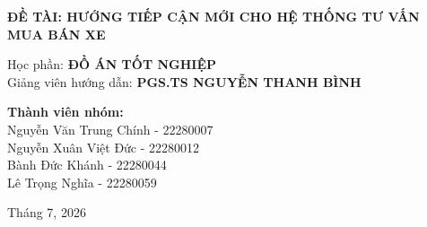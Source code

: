 \begin{titlepage}
	\vspace{1.5cm}
	\textbf{\large ĐỀ TÀI: HƯỚNG TIẾP CẬN MỚI CHO HỆ THỐNG TƯ VẤN MUA BÁN XE}
	\vspace{0.3cm}													
        \begin{center}
            \begin{minipage}{0.7\textwidth} %
                \raggedright %
                \normalsize
                Học phần: \textbf {ĐỒ ÁN TỐT NGHIỆP}\\
                Giảng viên hướng dẫn: \textbf{PGS.TS NGUYỄN THANH BÌNH}\\
            \end{minipage}
        \end{center}

														
	\vspace{1.5cm}
        \begin{center}
            \begin{minipage}{0.8\textwidth}
                \raggedright
                \normalsize
                \textbf{Thành viên nhóm:}
                \vspace{0.2cm}\\
                Nguyễn Văn Trung Chính - 22280007\\
                Nguyễn Xuân Việt Đức - 22280012\\
                Bành Đức Khánh - 22280044\\
                Lê Trọng Nghĩa - 22280059
            \end{minipage}
        \end{center}
														
	\vspace{3cm}
	 \par Tháng 7, 2026
													
	\thispagestyle{empty}
	\restoregeometry
\end{titlepage}

\clearpage 









 

\begingroup
\fontsize{12pt}{14pt}\selectfont
\tableofcontents
\clearpage
\listoffigures
\clearpage
\listoftables


